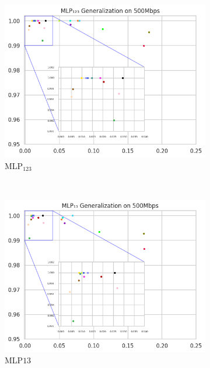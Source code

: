 \documentclass[a4paper,fleqn]{cas-sc}
\begin{document}
\begin{figure}[h!]
\begin{minipage}[t]{0.46\textwidth}
\begin{subfigure}[t]{0.33\textwidth}
			\includegraphics[draft=false, width=\textwidth]{./figs/Generalizacao-MLP123-500Mbps.png} 
			\caption{MLP$_{123}$}
			\label{fig:Generalizacao-MLP123-500Mbps}
		\end{subfigure}%
		~
		\begin{subfigure}[t]{0.33\textwidth}
			\includegraphics[draft=false, width=\textwidth]{./figs/Generalizacao-MLP13-500Mbps.png} 
			\caption{MLP${13}$}
			\label{fig:Generalizacao-MLP13-500Mbps}
		\end{subfigure}%
		~
		\begin{subfigure}[t]{0.33\textwidth}

\end{subfigure}
\end{minipage}
\end{figure}
\end{document}
